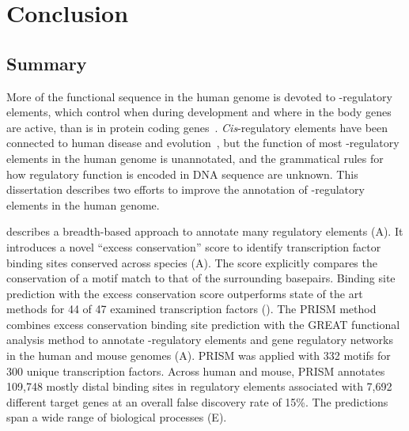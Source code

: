 \chapter{Conclusion}
\label{chap:conclusion}
%

\section{Summary}
More of the functional sequence in the human genome is devoted to \cis-regulatory elements,
which control when during development and where in the body genes are active, than
is in protein coding genes~\citep{Encode2011,Hsu2006}.  \textit{Cis}-regulatory elements have been connected to human
disease and evolution~\citep{Hindorff2009,Lettice2003,McLean2011}, but the function of most \cis-regulatory elements in the human genome is
unannotated, and the grammatical rules for how regulatory function is encoded in DNA
sequence are unknown.  This dissertation describes two efforts to improve the annotation of
\cis-regulatory elements in the human genome.

 describes a breadth-based approach to annotate many regulatory
elements (A).  It introduces a novel ``excess conservation'' score to identify transcription factor
binding sites conserved across species (A).  The score explicitly compares the conservation of a
motif match to that of the surrounding basepairs.  Binding site prediction with the excess
conservation score outperforms state of the art methods for 44 of 47 examined transcription
factors ().  The PRISM method combines excess conservation binding site prediction with the
GREAT functional analysis method to annotate \cis-regulatory elements and gene regulatory
networks in the human and mouse genomes (A).  PRISM was applied with 332 motifs for 300 unique
transcription factors.  Across human and mouse, PRISM annotates 109,748 mostly distal binding
sites in regulatory elements associated with 7,692 different target genes at an overall false
discovery rate of 15\%.  The predictions span a wide range of biological processes (E).

